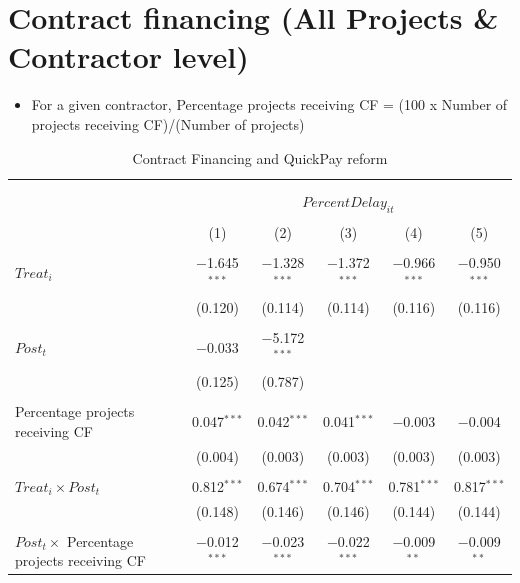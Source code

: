 \documentclass[
]{article}
\providecommand{\tightlist}{%
  \setlength{\itemsep}{0pt}\setlength{\parskip}{0pt}}
\begin{document}
\hypertarget{contract-financing-all-projects-contractor-level}{%
\section{Contract financing (All Projects \& Contractor
level)}\label{contract-financing-all-projects-contractor-level}}

\begin{itemize}
\tightlist
\item
  For a given contractor, Percentage projects receiving CF = (100 x
  Number of projects receiving CF)/(Number of projects)
\end{itemize}

\begin{table}[H] \centering 
  \caption{Contract Financing and QuickPay reform} 
  \label{} 
\small 
\begin{tabular}{@{\extracolsep{-2pt}}lccccc} 
\\[-1.8ex]\hline 
\hline \\[-1.8ex] 
\\[-1.8ex] & \multicolumn{5}{c}{$PercentDelay_{it}$  } \\ 
\\[-1.8ex] & (1) & (2) & (3) & (4) & (5)\\ 
\hline \\[-1.8ex] 
 $Treat_i$ & $-$1.645$^{***}$ & $-$1.328$^{***}$ & $-$1.372$^{***}$ & $-$0.966$^{***}$ & $-$0.950$^{***}$ \\ 
  & (0.120) & (0.114) & (0.114) & (0.116) & (0.116) \\ 
  & & & & & \\ 
 $Post_t$ & $-$0.033 & $-$5.172$^{***}$ &  &  &  \\ 
  & (0.125) & (0.787) &  &  &  \\ 
  & & & & & \\ 
 Percentage projects receiving CF & 0.047$^{***}$ & 0.042$^{***}$ & 0.041$^{***}$ & $-$0.003 & $-$0.004 \\ 
  & (0.004) & (0.003) & (0.003) & (0.003) & (0.003) \\ 
  & & & & & \\ 
 $Treat_i \times Post_t$ & 0.812$^{***}$ & 0.674$^{***}$ & 0.704$^{***}$ & 0.781$^{***}$ & 0.817$^{***}$ \\ 
  & (0.148) & (0.146) & (0.146) & (0.144) & (0.144) \\ 
  & & & & & \\ 
 $Post_t \times$ Percentage projects receiving CF & $-$0.012$^{***}$ & $-$0.023$^{***}$ & $-$0.022$^{***}$ & $-$0.009$^{**}$ & $-$0.009$^{**}$ \\ 

\end{tabular}
\end{table}
\end{document}
